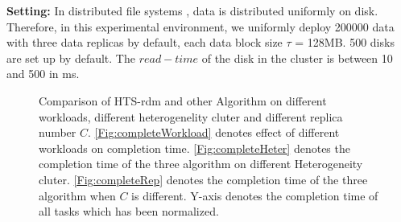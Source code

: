 \documentclass[conference]{IEEEtran}
\begin{document}
\textbf{Setting:}
In distributed file systems \cite{b19}, data is distributed uniformly on disk. Therefore, in this experimental environment, we uniformly deploy 200000 data with three data replicas by default, each data block size $\tau$ = 128MB. 500 disks are set up by default. The $read-time$ of the disk in the cluster is between 10 and 500 in ms. 


\begin{figure}[!t]
	\centering
	\quad\quad %
	\quad\quad
	\vspace{-1ex}
	\caption{Comparison of HTS-rdm and other Algorithm on different workloads, different heterogenelity cluter and different replica number $C$. \ref{Fig:completeWorkload} denotes effect of different workloads on completion time. \ref{Fig:completeHeter} denotes the completion time of the three algorithm on different Heterogeneity cluter. \ref{Fig:completeRep} denotes the completion time of the three algorithm when $C$ is different. Y-axis denotes the completion time of all tasks which has been normalized.}
	\label{Fig:complete}
	\vspace{-3ex}
\end{figure}
\end{document}

